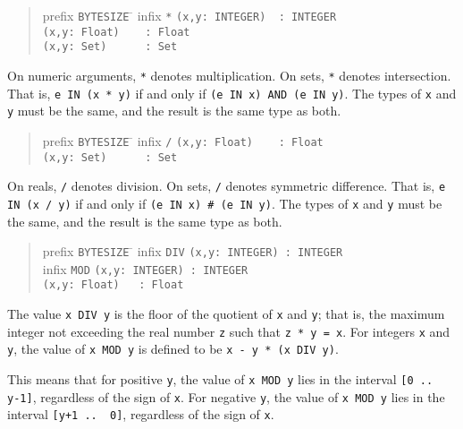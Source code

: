 \documentclass[10pt]{article}
\begin{document}
\begin{quote}
  \begin{tabbing}
    prefix \= \verb|BYTESIZE| \= \kill
    infix  \> \verb|*|       \> \verb|(x,y: INTEGER)  : INTEGER| \\
           \>                \> \verb|(x,y: Float)    : Float| \\
           \>                \> \verb|(x,y: Set)      : Set|
  \end{tabbing}
\end{quote}
On numeric arguments, \verb|*| denotes multiplication.  On sets, \verb|*|
denotes intersection.  That is, \verb|e IN (x * y)| if and only if
\verb|(e IN x) AND (e IN y)|.  The types of \verb|x| and \verb|y| must be the
same, and the result is the same type as both.

\begin{quote}
  \begin{tabbing}
    prefix \= \verb|BYTESIZE| \= \kill
    infix  \> \verb|/|       \> \verb|(x,y: Float)    : Float| \\
           \>                \> \verb|(x,y: Set)      : Set|
  \end{tabbing}
\end{quote}
On reals, \verb|/| denotes division.  On sets, \verb|/| denotes symmetric
difference.  That is, \verb|e IN (x / y)| if and only if
\verb|(e IN x) # (e IN y)|.  The types of \verb|x| and \verb|y| must be the
same, and the result is the same type as both.

\begin{quote}
  \begin{tabbing}
    prefix \= \verb|BYTESIZE| \= \kill
    infix  \> \verb|DIV|     \> \verb|(x,y: INTEGER) : INTEGER| \\
    infix  \> \verb|MOD|     \> \verb|(x,y: INTEGER) : INTEGER| \\
           \>                \> \verb|(x,y: Float)   : Float|
  \end{tabbing}
\end{quote}
The value \verb|x DIV y| is the floor of the quotient of \verb|x| and
\verb|y|; that is, the maximum integer not exceeding the real number \verb|z|
such that \verb|z * y = x|.  For integers \verb|x| and \verb|y|, the value of
\verb|x MOD y| is defined to be \verb|x - y * (x DIV y)|.

This means that for positive \verb|y|, the value of \verb|x MOD y| lies in the
interval \verb|[0 ..  y-1]|, regardless of the sign of \verb|x|.  For negative
\verb|y|, the value of \verb|x MOD y| lies in the interval \verb|[y+1 ..  0]|,
regardless of the sign of \verb|x|.
\end{document}
